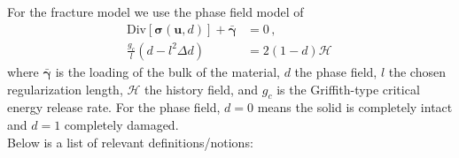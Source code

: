 \documentclass[11pt,a4paper]{article}
\begin{document}
For the fracture model we use the phase field model of \cite{Miehe2010}
\begin{align}
    \textrm{Div}[\boldsymbol{\sigma}(\mathbf{u},d)] + \bar{\boldsymbol{\gamma}} 
    &= 0
    \,,
    \label{eq:miehe_solid_balance_eq}
    \\
    \frac{g_c}{l}
    \left( d - l^2 \Delta d \right) 
    & = 2(1-d) \mathcal{H}
    \,
    \label{eq:miehe_phase_field_eq}
\end{align}
where $\bar{\boldsymbol{\gamma}}$ is the loading of the bulk of the material, $d$ the phase field, $l$ the chosen regularization length, $\mathcal{H}$ the history field, and $g_c$ is the Griffith-type critical energy release rate. For the phase field, $d=0$ means the solid is completely intact and $d=1$ completely damaged.
\\[10pt]
Below is a list of relevant definitions/notions:
\end{document}
